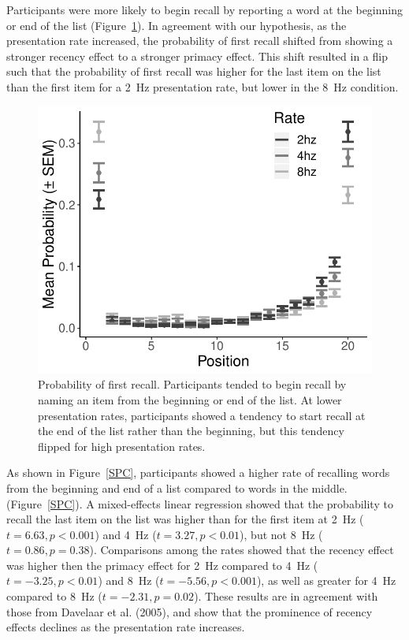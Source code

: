 \documentclass[10pt,letterpaper]{article}
\begin{document}
Participants were more likely to begin recall by reporting a word at the
beginning or end of the list (Figure~\ref{PFR}). In agreement with our
hypothesis, as the presentation rate increased, the probability of first recall
shifted from showing a stronger recency effect to a stronger primacy effect.
This shift resulted in a flip such that the probability of first recall was
higher for the last item on the list than the first item for a 2~Hz
presentation rate, but lower in the 8~Hz condition.

\begin{figure}
\begin{center}
\includegraphics[width = .4\textwidth]{PFR_adjusted.pdf}
\end{center}
\caption{Probability of first recall. Participants tended to begin recall by
naming an item from the beginning or end of the list. At lower presentation
rates, participants showed a tendency to start recall at the end of the list
rather than the beginning, but this tendency flipped for high presentation
rates.} \label{PFR}
\end{figure}

As shown in Figure~\ref{SPC}, participants showed a higher rate of recalling
words from the beginning and end of a list compared to words in the middle.
(Figure~\ref{SPC}). A mixed-effects linear regression showed that the
probability to recall the last item on the list was higher than for the first
item at 2~Hz ($t = 6.63, p < 0.001$) and 4~Hz ($t = 3.27, p < 0.01$), but not
8~Hz ($t = 0.86, p = 0.38$). Comparisons among the rates showed that the
recency effect was higher then the primacy effect for 2~Hz compared to 4~Hz
($t = -3.25, p < 0.01$) and 8~Hz ($t = -5.56, p < 0.001$), as well as greater
for 4~Hz compared to 8~Hz ($t = -2.31, p = 0.02$).  These results are in
agreement with those from Davelaar et al. (2005), and show that the prominence
of recency effects declines as the presentation rate increases. 
\nocite{DaveEtal05}
\end{document}
